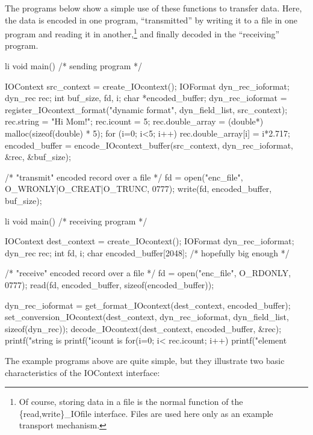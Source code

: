 \documentclass{article}
\begin{document}
The programs below show a simple use of these functions to transfer data.
Here, the data is encoded in one program, ``transmitted'' by writing it to a
file in one program and reading it in another,\footnote{Of course, storing
data in a file is the normal function of the \{read,write\}\_IOfile
interface.  Files are used here only as an example transport mechanism.}
and finally decoded in the ``receiving'' program.  
\begin{code}{li}
void main()     /* sending program */
{
    IOContext src_context = create_IOcontext();
    IOFormat dyn_rec_ioformat;
    dyn_rec rec;
    int buf_size, fd, i;
    char *encoded_buffer;
    dyn_rec_ioformat = register_IOcontext_format("dynamic format",
                                                  dyn_field_list,
                                                  src_context);
    rec.string = "Hi Mom!";
    rec.icount = 5;
    rec.double_array = (double*) malloc(sizeof(double) * 5);
    for (i=0; i<5; i++) 
        rec.double_array[i] = i*2.717;
    encoded_buffer = encode_IOcontext_buffer(src_context, 
                        dyn_rec_ioformat, &rec, &buf_size);

    /* "transmit" encoded record over a file */
    fd = open("enc_file", O_WRONLY|O_CREAT|O_TRUNC, 0777);
    write(fd, encoded_buffer, buf_size);
}
\end{code}
\begin{code}{li}
void main()     /* receiving program */
{
    IOContext dest_context = create_IOcontext();
    IOFormat dyn_rec_ioformat;
    dyn_rec rec;
    int fd, i;
    char encoded_buffer[2048];  /* hopefully big enough */

    /* "receive" encoded record over a file */
    fd = open("enc_file", O_RDONLY, 0777);
    read(fd, encoded_buffer, sizeof(encoded_buffer));

    dyn_rec_ioformat = get_format_IOcontext(dest_context, encoded_buffer);
    set_conversion_IOcontext(dest_context, dyn_rec_ioformat,
                             dyn_field_list, sizeof(dyn_rec));
    decode_IOcontext(dest_context, encoded_buffer, &rec);
    printf("string is %
    printf("icount is %
    for(i=0; i< rec.icount; i++)
        printf("element %
}
\end{code}
The example programs above are quite simple, but they illustrate two basic
characteristics of the IOContext interface:
\end{document}
